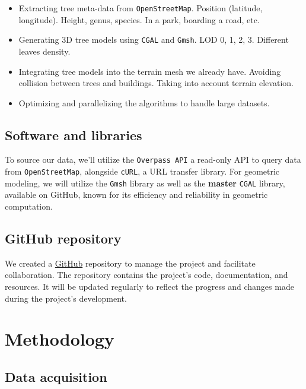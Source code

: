 \documentclass[12pt]{article}
\begin{document}
\begin{itemize}
    \item Extracting tree meta-data from \texttt{OpenStreetMap}.
    \subitem Position (latitude, longitude).
    \subitem Height, genus, species.
    \subitem In a park, boarding a road, etc.
    \item Generating 3D tree models using \texttt{CGAL}\cite{cgal} and \texttt{Gmsh}\cite{gmsh}.
    \subitem LOD 0, 1, 2, 3.
    \subitem Different leaves density.
    \item Integrating tree models into the terrain mesh we already have.
    \subitem Avoiding collision between trees and buildings.
    \subitem Taking into account terrain elevation.
    \item Optimizing and parallelizing the algorithms to handle large datasets.
\end{itemize}

\subsection{Software and libraries}
To source our data, we'll utilize the \texttt{Overpass API}\cite{overpass} a
read-only API to query data from \texttt{OpenStreetMap}, alongside
\texttt{cURL}\cite{curl}, a URL transfer library. For geometric modeling, we
will utilize the \texttt{Gmsh}\cite{gmsh} library as well as the \textbf{master} \texttt{CGAL} library, available on
GitHub\cite{cgal-master}, known for its efficiency and reliability in geometric
computation.

\subsection{GitHub repository}
We created a \href{https://github.com/feelpp/ktirio-geom}{GitHub}
repository to manage the project and facilitate collaboration.
The repository contains the project's code, documentation, and resources.
It will be updated regularly to reflect the progress and changes made during
the project's development.


\newpage

\section{Methodology}

\subsection{Data acquisition}
\end{document}
